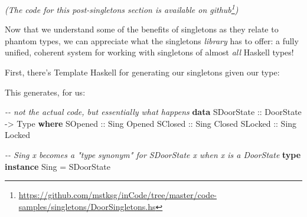 \documentclass[]{article}
\newenvironment{Shaded}{}{}
\newcommand{\CommentTok}[1]{\textcolor[rgb]{0.38,0.63,0.69}{\textit{#1}}}
\newcommand{\DataTypeTok}[1]{\textcolor[rgb]{0.56,0.13,0.00}{#1}}
\newcommand{\KeywordTok}[1]{\textcolor[rgb]{0.00,0.44,0.13}{\textbf{#1}}}
\newcommand{\NormalTok}[1]{#1}
\newcommand{\OperatorTok}[1]{\textcolor[rgb]{0.40,0.40,0.40}{#1}}
\newcommand{\OtherTok}[1]{\textcolor[rgb]{0.00,0.44,0.13}{#1}}
\renewcommand{\href}[2]{#2\footnote{\url{#1}}}
\begin{document}
\emph{(The code for this post-singletons section is available
\href{https://github.com/mstksg/inCode/tree/master/code-samples/singletons/DoorSingletons.hs}{on
github})}

Now that we understand some of the benefits of singletons as they relate to
phantom types, we can appreciate what the singletons \emph{library} has to
offer: a fully unified, coherent system for working with singletons of almost
\emph{all} Haskell types!

First, there's Template Haskell for generating our singletons given our type:

\begin{Shaded}
\end{Shaded}

This generates, for us:

\begin{Shaded}
\begin{Highlighting}[]
\CommentTok{{-}{-} not the actual code, but essentially what happens}
\KeywordTok{data} \DataTypeTok{SDoorState}\OtherTok{ ::} \DataTypeTok{DoorState} \OtherTok{{-}>} \DataTypeTok{Type} \KeywordTok{where}
    \DataTypeTok{SOpened}\OtherTok{ ::} \DataTypeTok{Sing} \DataTypeTok{\textquotesingle{}Opened}
    \DataTypeTok{SClosed}\OtherTok{ ::} \DataTypeTok{Sing} \DataTypeTok{\textquotesingle{}Closed}
    \DataTypeTok{SLocked}\OtherTok{ ::} \DataTypeTok{Sing} \DataTypeTok{\textquotesingle{}Locked}

\CommentTok{{-}{-} Sing x becomes a "type synonym" for SDoorState x when x is a DoorState}
\KeywordTok{type} \KeywordTok{instance} \DataTypeTok{Sing} \OtherTok{=} \DataTypeTok{SDoorState}
\end{Highlighting}
\end{Shaded}
\end{document}
